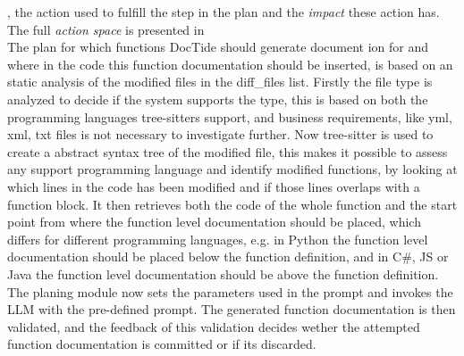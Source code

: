 
, the action used to fulfill the step in the plan and the \textit{impact} these action has. The full \textit{action space} is presented in 
\\
The plan for which functions DocTide should generate document ion for and where in the code this function documentation should be inserted, is based on an static analysis of the modified files in the diff\_files list. Firstly the file type is analyzed to decide if the system supports the type, this is based on both the programming languages tree-sitters support, and business requirements, like yml, xml, txt files is not necessary to investigate further. Now tree-sitter is used to create a abstract syntax tree of the modified file, this makes it possible to assess any support programming language and identify modified functions, by looking at which lines in the code has been modified and if those lines overlaps with a function block. It then retrieves both the code of the whole function and the start point from where the function level documentation should be placed, which differs for different programming languages, e.g. in Python the function level documentation should be placed below the function definition, and in C\#, JS or Java the function level documentation should be above the function definition. The planing module now sets the parameters used in the prompt and invokes the LLM with the pre-defined prompt. The generated function documentation is then validated, and the feedback of this validation decides wether the attempted function documentation is committed or if its discarded.